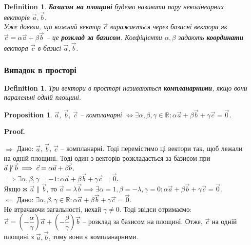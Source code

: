 \documentclass[a4paper, 10pt]{extarticle}
\makeatletter
\def\qed{$\blacksquare$}
\def\qed{$\blacksquare$}
\def\rightproof{$\boxed{\Rightarrow}$ }
\def\leftproof{$\boxed{\Leftarrow}$ }
\theoremstyle{theoremdd}
\theoremstyle{theoremdd}
\newtheorem{definition}[theorem]{Definition}
\theoremstyle{theoremdd}
\theoremstyle{theoremdd}
\theoremstyle{theoremdd}
\newtheorem{proposition}[theorem]{Proposition}
\theoremstyle{theoremdd}
\theoremstyle{theoremdd}
\theoremstyle{theoremdd}
\renewenvironment{proof}[1][Proof.\\]{\par
\pushQED{\hfill \qed}%
\normalfont \topsep6\p@\@plus6\p@\relax
\trivlist
\item\relax
{\bfseries
#1\@addpunct{.}}\hspace\labelsep\ignorespaces
}{%
\popQED\endtrivlist\@endpefalse
}
\makeatother
\begin{document}
\begin{definition}
\textbf{Базисом на площині} будемо називати пару неколінеарних векторів $\vec{a},\vec{b}$.\\
Уже довели, що кожний вектор $\vec{c}$ виражається через базисні вектори як $\vec{c} = \alpha \vec{a} + \beta \vec{b}$ -- це \textbf{розклад за базисом}. Коефіцієнти $\alpha, \beta$ задають \textbf{координати} вектора $\vec{c}$ в базисі $\vec{a},\vec{b}$.
\end{definition}
	
\subsubsection{Випадок в просторі}
\begin{definition}
Три вектори в просторі називаються \textbf{компланарними}, якщо вони паралельні одній площині.
\end{definition}

\begin{proposition}
$\vec{a}$, $\vec{b}$, $\vec{c}$ -- компланарні $\iff \exists \alpha, \beta, \gamma \in \mathbb{R}: \alpha \vec{a} + \beta \vec{b} + \gamma \vec{c} = \vec{0}$.
\end{proposition}

\begin{proof}
	\rightproof Дано: $\vec{a}$, $\vec{b}$, $\vec{c}$ -- компланарні. Тоді перемістимо ці вектори так, щоб лежали на одній площині. Тоді один з векторів розкладається за базисом при $\vec{a} \centernot\parallel \vec{b} \implies \vec{c} = \alpha \vec{a} + \beta \vec{b}$.\\
	$\implies \exists \alpha, \beta, \gamma = -1: \alpha \vec{a} + \beta \vec{b} + \gamma \vec{c} = \vec{0}$.\\
	Якщо ж $\vec{a} \parallel \vec{b}$, то $\vec{a} = \lambda \vec{b}\implies \exists \alpha = 1, \beta = -\lambda, \gamma = 0: \alpha \vec{a} + \beta \vec{b} + \gamma \vec{c} = \vec{0}$.
	\bigskip \\
	\leftproof Дано: $\exists \alpha, \beta, \gamma \in \mathbb{R}: \alpha \vec{a} + \beta \vec{b} + \gamma \vec{c} = \vec{0}$.\\
	Не втрачаючи загальності, нехай $\gamma \neq 0$. Тоді звідси отримаємо:\\
	$\vec{c} = \left( -\dfrac{\alpha}{\gamma} \right) \vec{a} + \left( -\dfrac{\beta}{\gamma} \right) \vec{b}$ -- розклад за базисом на площині. Отже, $\vec{c}$ на одній площині з $\vec{a},\vec{b}$, тому вони є компланарними.
\end{proof}
\end{document}
